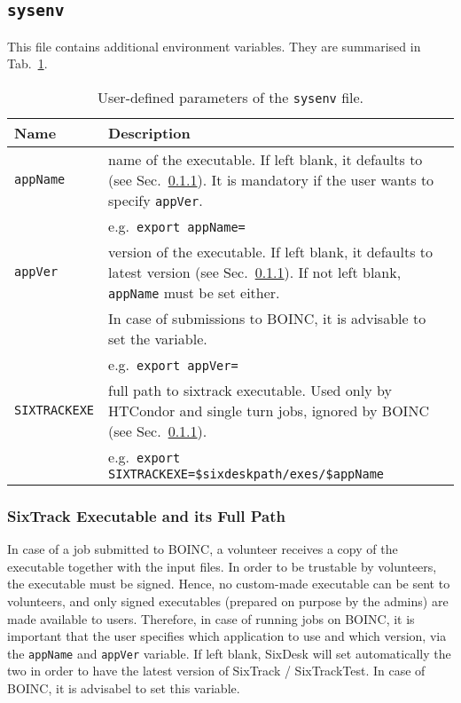 \subsection{\texttt{sysenv}}\label{Sec:InputFiles:sysenv}
This file contains additional environment variables.
They are summarised in Tab.~\ref{tab:sysenv}.
\begin{table}[h]
\begin{center}
    \caption{User-defined parameters of the \texttt{sysenv} file.}
    \label{tab:sysenv}
    \begin{tabular}{|p{3cm}|p{12cm}|}
    \hline
    \rowcolor{blue!30}
    \textbf{Name} & \textbf{Description} \\
    \hline
    \texttt{appName} & name of the executable.
    If left blank, it defaults to \texttt{\whichSixTrackVersion{}} (see Sec.~\ref{Sec:SixTrackExes}).
    It is mandatory if the user wants to specify \texttt{appVer}. \\
    & e.g.~\texttt{export appName=\whichSixTrack{}} \\
    \hline
    \texttt{appVer} & version of the executable.
    If left blank, it defaults to latest version (see Sec.~\ref{Sec:SixTrackExes}).
    If not left blank, \texttt{appName} must be set either. \\
    & In case of submissions to BOINC, it is advisable to set the variable. \\
    & e.g.~\texttt{export appVer=\whichSixTrackVersion{}} \\
    \hline
    \texttt{SIXTRACKEXE} & full path to sixtrack executable.
    Used only by HTCondor and single turn jobs, ignored by BOINC
    (see Sec.~\ref{Sec:SixTrackExes}). \\
    & e.g.~\texttt{export SIXTRACKEXE=\$sixdeskpath/exes/\$appName} \\
    \hline
    \end{tabular}
\end{center}
\end{table}

\subsubsection{SixTrack Executable and its Full Path}\label{Sec:SixTrackExes}
In case of a job submitted to BOINC, a volunteer receives
a copy of the executable together with the input files. In order to
be trustable by volunteers, the executable must be signed.
Hence, no custom-made executable can be sent to volunteers, and
only signed executables (prepared on purpose by the admins)
are made available to users.
Therefore, in case of running jobs on BOINC, it is important
that the user specifies which application to use and which version,
via the \texttt{appName} and \texttt{appVer} variable. If left
blank, SixDesk will set automatically the two in order to have
the latest version of SixTrack / SixTrackTest.
In case of BOINC, it is advisabel to set this variable.


